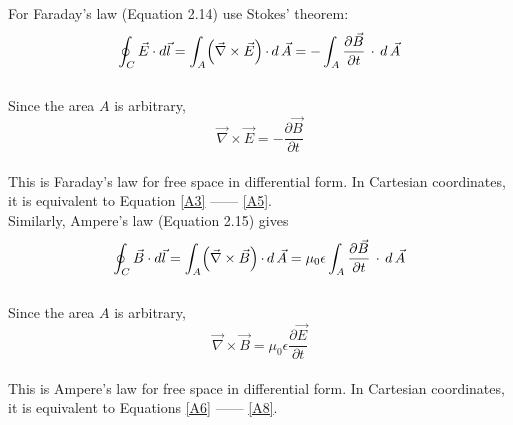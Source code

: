 \documentclass[12pt]{article}
\numberwithin{equation}{section}
\begin{document}
\indent For Faraday's law (Equation 2.14) use Stokes' theorem:
\[
    \oint_C \vec{E}\cdot d\vec{l}=\int_A \Bigl(\vec{\nabla}\times\vec{E}\Bigl)\,\cdot\,d\,\vec{A}=-\int_A \frac{\partial{\vec{B}}}{\partial{t}}\,\cdot \,d\,\vec{A}
\]
\\
Since the area $A$ is arbitrary,
\\
\begin{equation}
    \vec{\nabla}\times\vec{E}=-\frac{\partial{\vec{B}}}{\partial{t}}
\end{equation}
\\
This is Faraday's law for free space in differential form. In Cartesian coordinates, it is
equivalent to Equation \eqref{A3} —— \eqref{A5}.\\
\indent Similarly, Ampere's law (Equation 2.15) gives
\[
    \oint_C \vec{B}\cdot d\vec{l}=\int_A \Bigl(\vec{\nabla}\times\vec{B}\Bigl)\,\cdot\,d\,\vec{A}=\mu_0\epsilon\int_A \frac{\partial{\vec{B}}}{\partial{t}}\,\cdot \,d\,\vec{A}
\]
\\
Since the area $A$ is arbitrary,
\\
\begin{equation}
    \vec{\nabla}\times\vec{B}=\mu_0\epsilon\frac{\partial{\vec{E}}}{\partial{t}}
\end{equation}
\\
This is Ampere's law for free space in differential form. In Cartesian coordinates, it is equivalent to Equations \eqref{A6} —— \eqref{A8}.
\end{document}
